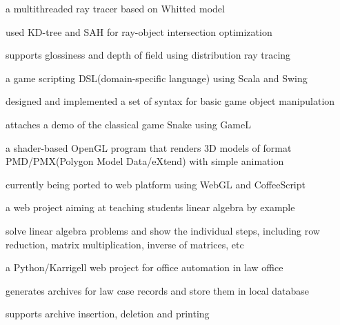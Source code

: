 \documentclass[]{deedy-resume-openfont}
\begin{document}
\begin{minipage}[t]{0.66\textwidth}
\begin{tightemize} 
\item a multithreaded ray tracer based on Whitted model
\item used KD-tree and SAH for ray-object intersection optimization
\item supports glossiness and depth of field using distribution ray tracing
\end{tightemize}
\sectionsep

\begin{tightemize} 
\item a game scripting DSL(domain-specific language) using Scala and Swing
\item designed and implemented a set of syntax for basic game object manipulation
\item attaches a demo of the classical game Snake using GameL
\end{tightemize}
\sectionsep

\begin{tightemize} 
\item a shader-based OpenGL program that renders 3D models of format PMD/PMX(Polygon Model Data/eXtend) with simple animation
\item currently being ported to web platform using WebGL and CoffeeScript
\end{tightemize}
\sectionsep

\begin{tightemize} 
\item a web project aiming at teaching students linear algebra by example
\item solve linear algebra problems and show the individual steps,
    including row reduction, matrix multiplication, inverse of matrices, etc
\end{tightemize}
\sectionsep

\begin{tightemize} 
\item a Python/Karrigell web project for office automation in law office
\item generates archives for law case records and store them in local database
\item supports archive insertion, deletion and printing
\end{tightemize}
\sectionsep


\end{minipage}
\end{document}
